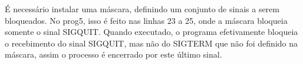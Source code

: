 \vspace{-0.5em}
\begin{minipage}{\textwidth}
  \hspace{-1em}
  \centering
  
  \label{prog5}
  \hspace{1em}
\end{minipage}
\vspace{0.5em}

É necessário instalar uma máscara, definindo um conjunto de sinais a serem bloqueados. No prog5, isso é feito nas linhas 23 a 25, onde a máscara bloqueia somente o sinal SIGQUIT. Quando executado, o programa efetivamente bloqueia o recebimento do sinal SIGQUIT, mas não do SIGTERM que não foi definido na máscara, assim o processo é encerrado por este último sinal. 


